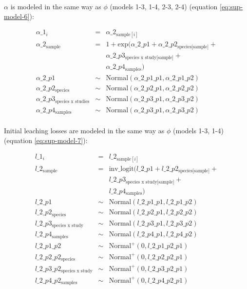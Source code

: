 \documentclass[
  12pt,
]{article}
\begin{document}
\(\alpha\) is modeled in the same way as \(\phi\) (models 1-3, 1-4, 2-3, 2-4) (equation \eqref{eq:sup-model-6}):

\begin{equation}
\begin{aligned}
\alpha\_1_i & = & \alpha\_2_{\text{sample}[i]}\\
\alpha\_2_{\text{sample}} & = & 1 + \text{exp}(\alpha\_2\_p1 + \alpha\_2\_p2_{\text{species[sample]}} + \\
                         && \alpha\_2\_p3_{\text{species x study[sample]}} + \\
                         && \alpha\_2\_p4_{\text{samples}})\\
\alpha\_2\_p1 & \sim & \text{Normal}(\alpha\_2\_p1\_p1, \alpha\_2\_p1\_p2)\\
\alpha\_2\_p2_{\text{species}} & \sim & \text{Normal}(\alpha\_2\_p2\_p1, \alpha\_2\_p2\_p2)\\
\alpha\_2\_p3_{\text{species x studies}} & \sim & \text{Normal}(\alpha\_2\_p3\_p1, \alpha\_2\_p3\_p2)\\
\alpha\_2\_p4_{\text{samples}} & \sim & \text{Normal}(\alpha\_2\_p3\_p1, \alpha\_2\_p3\_p2)\\
\label{eq:sup-model-6}
\end{aligned}
\end{equation}

Initial leaching losses are modeled in the same way as \(\phi\) (models 1-3, 1-4) (equation \eqref{eq:sup-model-7}):

\begin{equation}
\begin{aligned}
l\_1_i & = & l\_2_{\text{sample}[i]}\\
l\_2_{\text{sample}} & = & \text{inv\_logit}(l\_2\_p1 + l\_2\_p2_{\text{species[sample]}} + \\
                        && l\_2\_p3_{\text{species x study[sample]}} + \\                              && l\_2\_p4_{\text{samples}})\\
l\_2\_p1 & \sim & \text{Normal}(l\_2\_p1\_p1, l\_2\_p1\_p2)\\
l\_2\_p2_{\text{species}} & \sim & \text{Normal}(l\_2\_p2\_p1, l\_2\_p2\_p2)\\
l\_2\_p3_{\text{species x study}} & \sim & \text{Normal}(l\_2\_p3\_p1, l\_2\_p3\_p2)\\
l\_2\_p4_{\text{samples}} & \sim & \text{Normal}(l\_2\_p4\_p1, l\_2\_p4\_p2)\\
l\_2\_p1\_p2 & \sim & \text{Normal}^+(0, l\_2\_p1\_p2\_p1)\\
l\_2\_p2\_p2_{\text{species}} & \sim & \text{Normal}^+(0, l\_2\_p2\_p2\_p1)\\
l\_2\_p3\_p2_{\text{species x study}} & \sim & \text{Normal}^+(0, l\_2\_p3\_p2\_p1)\\
l\_2\_p4\_p2_{\text{samples}} & \sim & \text{Normal}^+(0, l\_2\_p4\_p2\_p1)\\
\label{eq:sup-model-7}
\end{aligned}
\end{equation}
\end{document}
